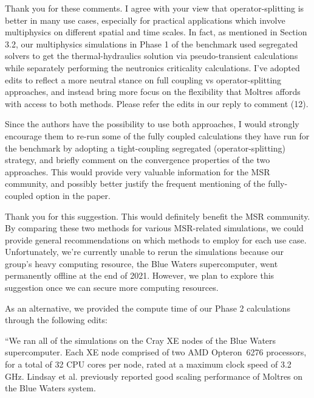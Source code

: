 \documentclass[answers,11pt]{exam}
\begin{document}
\begin{questions}
        \begin{solution}
        	Thank you for these comments. I agree with your view that
        	operator-splitting is better in many use cases, especially for
        	practical applications which involve multiphysics on different
        	spatial and time scales. In fact, as mentioned in Section 3.2,
        	our multiphysics simulations in
        	Phase 1 of the benchmark used segregated solvers to get the
        	thermal-hydraulics solution via pseudo-transient calculations while
        	separately performing the neutronics criticality calculations. I've
        	adopted edits to reflect a more neutral stance on full coupling
        	vs operator-splitting approaches, and instead bring more focus on
        	the flexibility that Moltres affords with access to both methods.
        	Please refer the edits in our reply to comment (12).
        \end{solution}
        
        \question Since the authors have the possibility to use both approaches, I would strongly encourage them to re-run some of the fully coupled calculations they have run for the benchmark by adopting a tight-coupling segregated (operator-splitting) strategy, and briefly comment on the convergence properties of the two approaches. This would provide very valuable information for the MSR community, and possibly better justify the
frequent mentioning of the fully-coupled option in the paper.

        \begin{solution}
            Thank you for this suggestion. This would definitely benefit the
            MSR community. By comparing these
            two methods for various MSR-related simulations, we could provide
            general recommendations on which methods to employ for each
            use case.
            Unfortunately, we're currently unable to rerun the simulations
        	because our group's heavy computing resource, the Blue Waters
        	supercomputer, went permanently offline at the end of 2021.
        	However, we plan to explore this suggestion once we can secure more
        	computing resources.
        	
        	As an alternative, we provided the compute time of our
        	Phase 2 calculations through the following edits:
        	
        	``We ran all of the simulations on the Cray XE nodes of the Blue Waters
supercomputer. Each XE node comprised of two AMD Opteron\texttrademark\ 6276
processors, for a total of 32 CPU cores per node, rated at a maximum clock
speed of 3.2 GHz. Lindsay et al. \cite{lindsay_introduction_2018} previously
reported good scaling performance of Moltres on the Blue Waters system.


\end{solution}
\end{questions}
\end{document}
